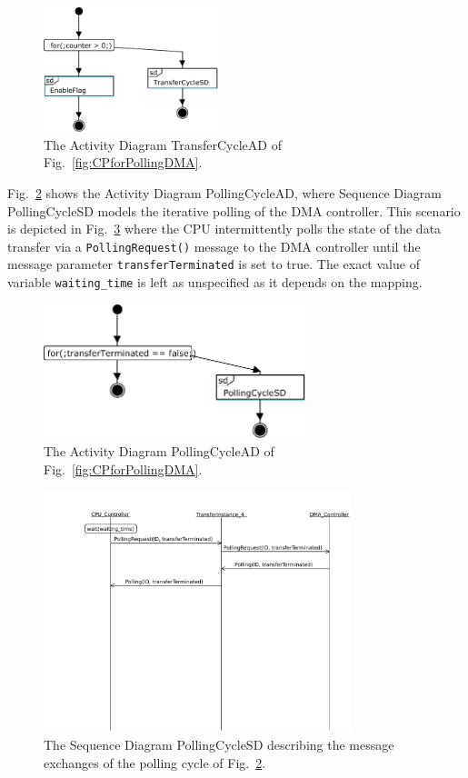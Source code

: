 \documentclass{llncs}
\begin{document}
\begin{figure}[!htbp]
	\centering
	\includegraphics[width=2in]{figures/TransferCycleAD.pdf}
	\caption{The Activity Diagram TransferCycleAD of Fig.~\ref{fig:CPforPollingDMA}.}
	\label{fig:TransferCycleAD}
\end{figure}

Fig.~\ref{fig:ADPollingCycle} shows the Activity Diagram PollingCycleAD, where Sequence Diagram PollingCycleSD models
the iterative polling of the DMA controller. This scenario is depicted in Fig.~\ref{fig:SDPollingDMA} where the CPU
intermittently polls the state of the data transfer via a {\tt PollingRequest()} message to the DMA controller until the
message parameter {\tt transferTerminated} is set to true. The exact value of variable {\tt waiting\_time} is left as
unspecified as it depends on the mapping.

\begin{figure}[!htbp]
	\centering
	\includegraphics[width=3in]{figures/PollingCycleAD.pdf}
	\caption{The Activity Diagram PollingCycleAD of
	Fig.~\ref{fig:CPforPollingDMA}.}
	\label{fig:ADPollingCycle}
\end{figure}

\begin{figure}[!htbp]
	\centering
	\includegraphics[trim= 0cm 9cm 0cm 0cm,
	clip, width=0.8\textwidth]{figures/PollingCycleSD.pdf}
	\caption{The Sequence Diagram PollingCycleSD describing the message exchanges of the polling cycle of Fig.~\ref{fig:ADPollingCycle}.}
	\label{fig:SDPollingDMA}
\end{figure}
\end{document}
